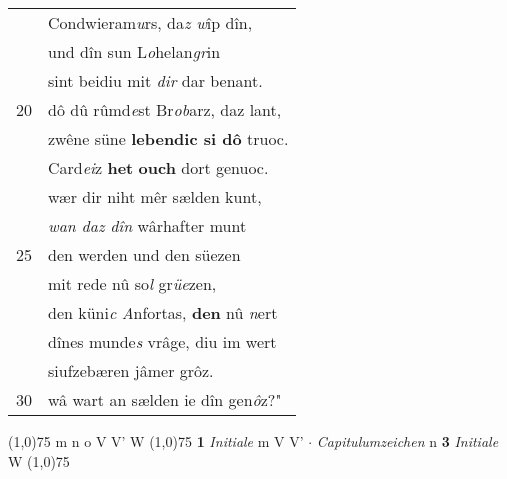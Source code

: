 \documentclass[8pt,a4paper,notitlepage]{article}
\begin{document}
\begin{table}[ht]
\begin{minipage}[t]{0.5\linewidth}
\begin{tabular}{rl}
 & Condwieram\textit{u}rs, da\textit{z w}îp dîn,\\ 
 & und dîn sun L\textit{o}helan\textit{gr}in\\ 
 & sint beidiu mit \textit{dir} dar benant.\\ 
20 & dô dû rûmd\textit{e}st Br\textit{ob}arz, daz lant,\\ 
 & zwêne süne \textbf{lebendic si dô} truoc.\\ 
 & Card\textit{ei}z \textbf{het} \textbf{ouch} dort genuoc.\\ 
 & wær dir niht mêr sælden kunt,\\ 
 & \textit{wan daz dîn} wârhafter munt\\ 
25 & den werden und den süezen\\ 
 & mit rede nû so\textit{l} gr\textit{üe}zen,\\ 
 & den küni\textit{c} \textit{A}nfortas, \textbf{den} nû \textit{n}ert\\ 
 & dînes munde\textit{s} vrâge, diu im wert\\ 
 & siufzebæren jâmer grôz.\\ 
30 & wâ wart an sælden ie dîn gen\textit{ô}z?"\\ 
\end{tabular}
\scriptsize
\line(1,0){75} \newline
m n o V V' W \newline
\line(1,0){75} \newline
\textbf{1} \textit{Initiale} m V V'   $\cdot$ \textit{Capitulumzeichen} n  \textbf{3} \textit{Initiale} W  \newline
\line(1,0){75} \newline

\end{minipage}
\end{table}
\end{document}
